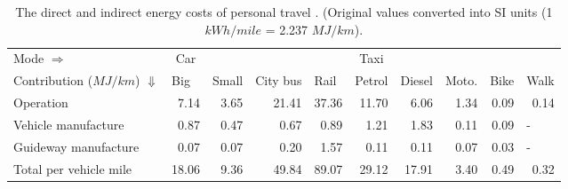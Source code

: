 
\begin{table}[h]
\centerline{}
\caption[The direct and indirect energy costs of personal travel
\citep{Fels1975}]{The direct and indirect energy costs of personal travel
\citep{Fels1975}. (Original values  converted into SI units
(1 $kWh/mile$ = 2.237 $MJ/km$).}
\begin{tabular}{p{2.1cm}rrrrrrrrl}
\toprule
 Mode $\Rightarrow$ & \multicolumn{1}{c}{Car} & \multicolumn{1}{l}{} &
\multicolumn{1}{l}{} & \multicolumn{1}{l}{} & \multicolumn{1}{c}{Taxi} &
\multicolumn{1}{l}{} & \multicolumn{1}{l}{} &
\multicolumn{1}{l}{} & \\
Contribution ($MJ/km$) $\Downarrow$ & \multicolumn{1}{l}{Big} &
\multicolumn{1}{l}{Small} & \multicolumn{1}{l}{City bus} &
\multicolumn{1}{l}{Rail} & \multicolumn{1}{l}{Petrol} &
\multicolumn{1}{l}{Diesel}& \multicolumn{1}{l}{Moto.} & \multicolumn{1}{l}{Bike}
& Walk \\
\midrule
Operation  & 7.14 & 3.65 & 21.41 & 37.36 & 11.70 & 6.06 & 1.34 & 0.09 & \multicolumn{1}{r}{0.14} \\
Vehicle manufacture & 0.87 & 0.47 & 0.67 & 0.89 & 1.21 & 1.83 & 0.11 & 0.09 & - \\
Guideway manufacture & 0.07 & 0.07 & 0.20 & 1.57 & 0.11 & 0.11 & 0.07 & 0.03 & - \\
Total per vehicle mile & 18.06 & 9.36 & 49.84 & 89.07 & 29.12 & 17.91 & 3.40 & 0.49 & \multicolumn{1}{r}{0.32} \\
\bottomrule
\end{tabular}
\label{t:fels}
\end{table}

